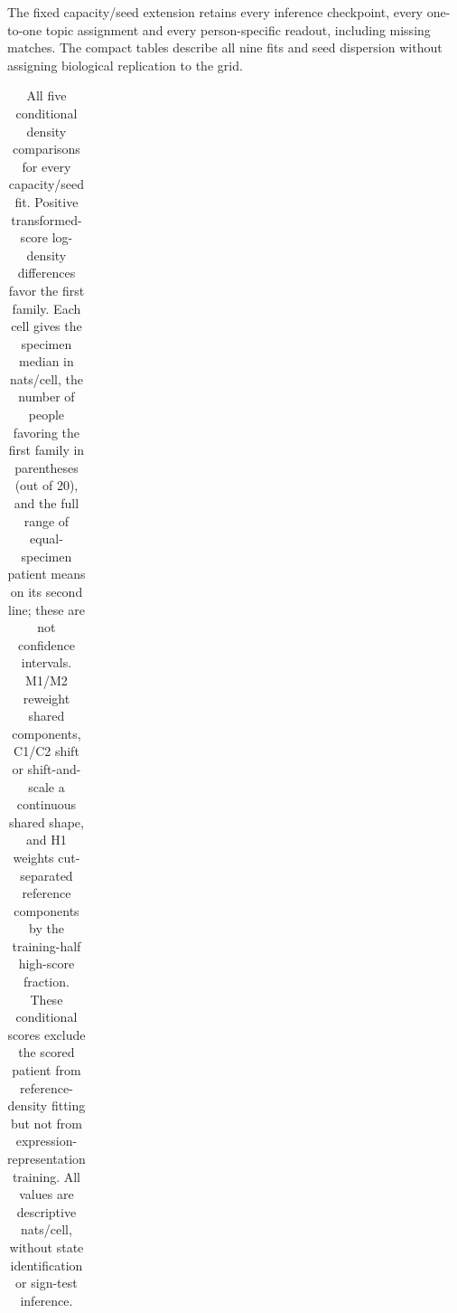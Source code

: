 \documentclass[10pt,a4paper]{article}
\begin{document}
The fixed capacity/seed extension retains every inference checkpoint, every one-to-one topic assignment and every person-specific readout, including missing matches. The compact tables describe all nine fits and seed dispersion without assigning biological replication to the grid.
{\small{}
{\setlength{\tabcolsep}{2pt}
\begin{longtable}{@{}p{9mm}p{11mm}p{29mm}p{29mm}p{29mm}p{29mm}p{29mm}@{}}
\caption{All five conditional density comparisons for every capacity/seed fit. Positive transformed-score log-density differences favor the first family. Each cell gives the specimen median in nats/cell, the number of people favoring the first family in parentheses (out of 20), and the full range of equal-specimen patient means on its second line; these are not confidence intervals. M1/M2 reweight shared components, C1/C2 shift or shift-and-scale a continuous shared shape, and H1 weights cut-separated reference components by the training-half high-score fraction. These conditional scores exclude the scored patient from reference-density fitting but not from expression-representation training. All values are descriptive nats/cell, without state identification or sign-test inference.}\label{tab:p1qualitydensity}\\

\end{longtable}}}
\end{document}
